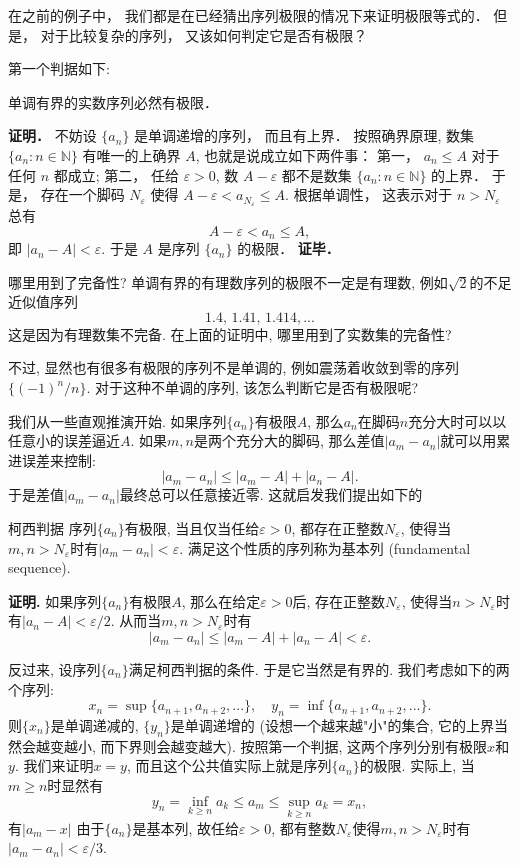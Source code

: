 

在之前的例子中， 我们都是在已经猜出序列极限的情况下来证明极限等式的． 但是， 对于比较复杂的序列， 又该如何判定它是否有极限？

第一个判据如下:

\begin{theorem}{}
单调有界的实数序列必然有极限．
\end{theorem}
\textbf{证明．} 不妨设 $\{a_n\}$ 是单调递增的序列， 而且有上界． 按照确界原理, 数集 $\{a_n:n\in\mathbb{N}\}$ 有唯一的上确界 $A$, 也就是说成立如下两件事： 第一， $a_n\leq A$ 对于任何 $n$ 都成立; 第二， 任给 $\varepsilon>0$, 数 $A-\varepsilon$ 都不是数集 $\{a_n:n\in\mathbb{N}\}$ 的上界． 于是， 存在一个脚码 $N_\varepsilon$ 使得 $A-\varepsilon<a_{N_\varepsilon}\leq A$. 根据单调性， 这表示对于 $n>N_\varepsilon$ 总有
\[A-\varepsilon<a_n\leq A,\]
即 $|a_n-A|<\varepsilon$. 于是 $A$ 是序列 $\{a_n\}$ 的极限． \textbf{证毕．}

\begin{exercise}{哪里用到了完备性?}
单调有界的有理数序列的极限不一定是有理数, 例如$\sqrt{2}$的不足近似值序列
$$
1.4,\,1.41,\,1.414,...
$$
这是因为有理数集不完备. 在上面的证明中, 哪里用到了实数集的完备性?
\end{exercise}

不过, 显然也有很多有极限的序列不是单调的, 例如震荡着收敛到零的序列$\{(-1)^n/n\}$. 对于这种不单调的序列, 该怎么判断它是否有极限呢?

我们从一些直观推演开始. 如果序列$\{a_n\}$有极限$A$, 那么$a_n$在脚码$n$充分大时可以以任意小的误差逼近$A$. 如果$m,n$是两个充分大的脚码, 那么差值$|a_m-a_n|$就可以用累进误差来控制:
$$
|a_m-a_n|\leq |a_m-A|+|a_n-A|.
$$
于是差值$|a_m-a_n|$最终总可以任意接近零. 这就启发我们提出如下的

\begin{theorem}{柯西判据}
序列$\{a_n\}$有极限, 当且仅当任给$\varepsilon>0$, 都存在正整数$N_\varepsilon$, 使得当$m,n>N_\varepsilon$时有$|a_m-a_n|<\varepsilon$. 满足这个性质的序列称为基本列 (fundamental sequence).
\end{theorem}

\textbf{证明.} 如果序列$\{a_n\}$有极限$A$, 那么在给定$\varepsilon>0$后, 存在正整数$N_\varepsilon$, 使得当$n>N_\varepsilon$时有$|a_n-A|<\varepsilon/2$. 从而当$m,n>N_\varepsilon$时有
$$
|a_m-a_n|\leq|a_m-A|+|a_n-A|<\varepsilon.
$$

反过来, 设序列$\{a_n\}$满足柯西判据的条件. 于是它当然是有界的. 我们考虑如下的两个序列:
$$
x_n=\sup\{a_{n+1},a_{n+2},...\},
\quad
y_n=\inf\{a_{n+1},a_{n+2},...\}.
$$
则$\{x_n\}$是单调递减的, $\{y_n\}$是单调递增的 (设想一个越来越"小"的集合, 它的上界当然会越变越小, 而下界则会越变越大). 按照第一个判据, 这两个序列分别有极限$x$和$y$. 我们来证明$x=y$, 而且这个公共值实际上就是序列$\{a_n\}$的极限. 实际上, 当$m\geq n$时显然有
$$
y_n=\inf_{k\geq n}a_k\leq a_m\leq \sup_{k\geq n}a_k=x_n,
$$
有$|a_m-x|$
由于$\{a_n\}$是基本列, 故任给$\varepsilon>0$, 都有整数$N_\varepsilon$使得$m,n>N_\varepsilon$时有$|a_m-a_n|<\varepsilon/3$. 